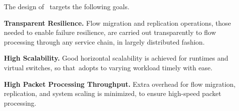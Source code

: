 



The design of \nfactor~targets the following goals. %

{\bf Transparent Resilience.}  Flow migration and replication operations, those needed to enable failure resilience, are carried out transparently to flow processing through any service chain, in largely distributed fashion.


{\bf High Scalability.} Good horizontal scalability is achieved for runtimes and virtual switches, so that~\nfactor adopts to varying workload timely with ease.

{\bf High Packet Processing Throughput.} Extra overhead for flow migration, replication, and system scaling is minimized, to ensure high-speed packet processing.
